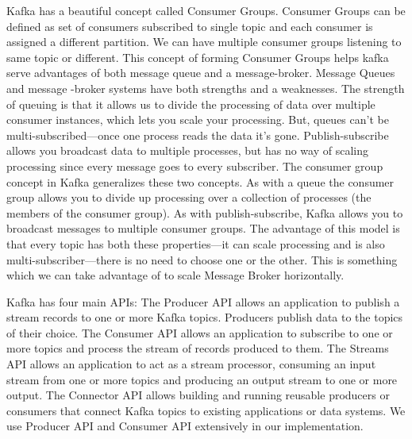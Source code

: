 {Kafka has a beautiful concept called Consumer Groups. Consumer Groups can be 
defined as set of consumers subscribed to single topic and each consumer is 
assigned a different partition. We can have multiple consumer groups listening 
to same topic or different. This concept of forming Consumer Groups helps kafka
serve advantages of both message queue and a message-broker. Message Queues and 
message -broker systems have both strengths and a weaknesses. The strength of
queuing is that it allows us to divide the processing of data over multiple
consumer instances, which lets you scale your processing. But, queues can't be
multi-subscribed—once one process reads the data it's gone. Publish-subscribe 
allows you broadcast data to multiple processes, but has no way of scaling 
processing since every message goes to every subscriber. The consumer group 
concept in Kafka generalizes these two concepts. As with a queue the consumer 
group allows you to divide up processing over a collection of processes 
(the members of the consumer group). As with publish-subscribe,
Kafka allows you to broadcast messages to multiple consumer groups. The 
advantage of this model is that every topic has both these properties—it can 
scale processing and is also multi-subscriber—there is no need to choose one or
the other. This is something which we can take advantage of to scale Message 
Broker horizontally.


Kafka has four main APIs: The Producer API allows an application to publish a 
stream records to one or more Kafka topics. Producers publish data to the topics
of their choice. 
The Consumer API allows an application to subscribe to one
or more topics and process the stream of records produced to them. 
The Streams API allows an application to act as a stream processor, consuming an
input stream from one or more topics and producing an output stream to one or 
more output.
The Connector API allows building and running reusable producers or consumers 
that connect Kafka topics to existing applications or data systems. 
We use Producer API and Consumer API extensively in our implementation.
}
